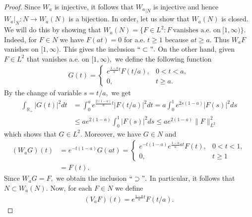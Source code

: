 \documentclass[10pt,a4paper]{amsart}
\begin{document}
\begin{proof}
Since $W_a$ is injective, it follows that ${W_a}_{|N}$ is injective and hence ${W_a}|_{N}: N \to W_a(N)$ is a bijection. In order, let us show  that $W_a(N)$ is closed. We will do this by showing that $W_a(N)=\{F\in L^2:F\ \text{vanishes a.e. on}\ [1, \infty) \}.$ Indeed,  for $F\in N$ we have $F(at)=0$ for a.e. $t\geq1$ because $at \geq a$. Thus $W_aF$ vanishes on $[1,\infty).$ This gives the inclusion $``\subset".$ On the other hand, given $F\in L^2$ that vanishes a.e. on $[1,\infty),$ we define the following function
\begin{align}\label{surjective}
G(t)=\begin{cases}
e^{\frac{1-a}{a}t}F(t/a), & 0<t<a,\\
0,& t\geq a.
\end{cases}
\end{align}
By the change of variable $s=t/a,$ we get
\begin{align*}
\int_{\mathbb{R}_+}|G(t)|^2dt&=\int_{0}^{a} e^{\frac{2(1-a)}{a}t}|F(t/a)|^2dt = a\int^1_0 e^{2s(1-a)}|F(s)|^2ds\\
&\leq ae^{2(1-a)}\int^1_0|F(s)|^2ds\leq ae^{2(1-a)}\|F\|_{L^2}^2
\end{align*}
which shows that $G\in L^2.$ Moreover, we have $G\in N$ and
\begin{align*}
(W_aG)(t)&=e^{-t(1-a)}G(at)=\begin{cases}
e^{-t(1-a)}e^{\frac{1-a}{a}at}F(t), & 0<t<1,\\
0,& t\geq 1
\end{cases}\\
&=F(t).
\end{align*}
Since $W_aG=F,$ we obtain the inclusion $``\supset ".$ In particular, it follows that $N\subset W_a(N).$ Now, for each $F\in N$ we define
\begin{align*}
(V_aF)(t)=e^{\frac{1-a}{a}t}F(t/a).
\end{align*}




\end{proof}
\end{document}
